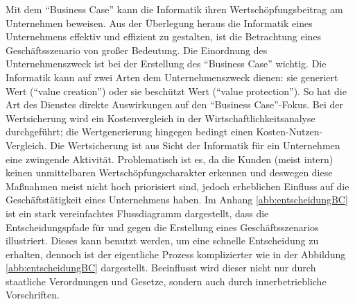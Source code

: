 Mit dem \enquote{Business Case} kann die Informatik ihren Wertschöpfungsbeitrag am Unternehmen beweisen. Aus der Überlegung heraus die Informatik eines Unternehmens effektiv und effizient zu gestalten, ist die Betrachtung eines Geschäftsszenario von großer Bedeutung. Die Einordnung des Unternehmenszweck ist bei der Erstellung des \enquote{Business Case} wichtig. Die Informatik kann auf zwei Arten dem Unternehmenszweck dienen: sie generiert Wert (\enquote{value creation}) oder sie beschützt Wert (\enquote{value protection}). So hat die Art des Dienstes direkte Auswirkungen auf den \enquote{Business Case}-Fokus. Bei der Wertsicherung wird ein Kostenvergleich in der Wirtschaftlichkeitsanalyse durchgeführt; die Wertgenerierung hingegen bedingt einen Kosten-Nutzen-Vergleich. Die Wertsicherung ist aus Sicht der Informatik für ein Unternehmen eine zwingende Aktivität. Problematisch ist es, da die Kunden (meist intern) keinen unmittelbaren Wertschöpfungscharakter erkennen und deswegen diese Maßnahmen meist nicht hoch priorisiert sind, jedoch erheblichen Einfluss auf die Geschäftstätigkeit eines Unternehmens haben.\autocite[vgl.][S.\,27]{brugger_it_2009} Im Anhang \vref{abb:entscheidungBC} ist ein stark vereinfachtes Flussdiagramm dargestellt, dass die Entscheidungspfade für und gegen die Erstellung eines Geschäftsszenarios illustriert. Dieses kann benutzt werden, um eine schnelle Entscheidung zu erhalten, dennoch ist der eigentliche Prozess komplizierter wie in der Abbildung \vref{abb:entscheidungBC} dargestellt. Beeinflusst wird dieser nicht nur durch staatliche Verordnungen und Gesetze, sondern auch durch innerbetriebliche Vorschriften. 
\par
